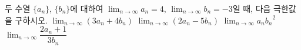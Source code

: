 두 수열 $\{a_n\}$, $\{b_n\}$에 대하여 $\displaystyle\lim_{n\to\infty}a_n=4$, $\displaystyle\lim_{n\to\infty}b_n=-3$일 때, 다음 극한값을 구하시오.
 $\displaystyle\lim_{n\to\infty}(3a_n+4b_n)$
 $\displaystyle\lim_{n\to\infty}(2a_n-5b_n)$
 $\displaystyle\lim_{n\to\infty}a_n{b_n}^2$
 $\displaystyle\lim_{n\to\infty}\dfrac{2a_n+1}{3b_n}$
